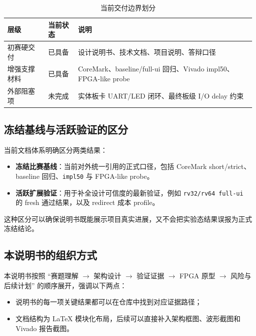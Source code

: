 \begin{table}[H]
    \centering
    \caption{当前交付边界划分}
    \begin{tabular}{p{} p{} p{}}
        \toprule
        层级 & 当前状态 & 说明 \\
        \midrule
        初赛硬交付 & 已具备 & 设计说明书、技术文档、项目说明、答辩口径 \\
        增强支撑材料 & 已具备 & CoreMark、baseline/full-ui 回归、Vivado impl50、FPGA-like probe \\
        外部阻塞项 & 未完成 & 实体板卡 UART/LED 闭环、最终板级 I/O delay 约束 \\
        \bottomrule
    \end{tabular}
\end{table}

\subsection{冻结基线与活跃验证的区分}

当前文档体系明确区分两类结果：

\begin{itemize}
    \item \textbf{冻结比赛基线}：当前对外统一引用的正式口径，包括 CoreMark short/strict、
    baseline 回归、\texttt{impl50} 与 FPGA-like probe。
    \item \textbf{活跃扩展验证}：用于补全设计可信度的最新验证，例如
    \texttt{rv32/rv64 full-ui} 的 fresh 通过结果，以及 redirect 成本 profile。
\end{itemize}

这种区分可以确保说明书既能展示项目真实进展，又不会把实验态结果误报为正式冻结结论。

\subsection{本说明书的组织方式}

本说明书按照 ``赛题理解 $\rightarrow$ 架构设计 $\rightarrow$ 验证证据 $\rightarrow$
FPGA 原型 $\rightarrow$ 风险与后续计划'' 的顺序展开，强调以下两点：

\begin{itemize}
    \item 说明书的每一项关键结果都可以在仓库中找到对应证据路径；
    \item 文档结构为 LaTeX 模块化布局，后续可以直接补入架构框图、波形截图和 Vivado 报告截图。
\end{itemize}

\clearpage
